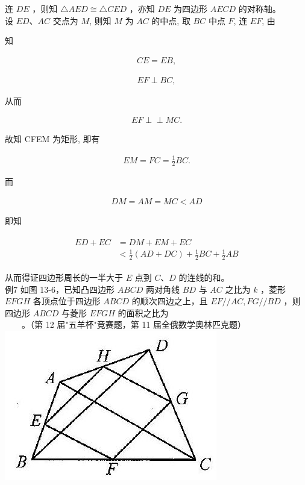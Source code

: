 \documentclass[10pt]{article}
\def\Perp{\perp\!\!\!\perp}
\begin{document}
连 $D E$ ，则知 $\triangle A E D \cong \triangle C E D$ ，亦知 $D E$ 为四边形 $A E C D$ 的对称轴。\\
设 $E D 、 A C$ 交点为 $M$, 则知 $M$ 为 $A C$ 的中点, 取 $B C$ 中点 $F$, 连 $E F$, 由

知

\begin{align*}
C E=E B,
\end{align*}

\begin{align*}
E F \perp B C,
\end{align*}

从而

\begin{align*}
E F \Perp M C .
\end{align*}

故知 CFEM 为矩形, 即有

\begin{align*}
E M=F C=\frac{1}{2} B C .
\end{align*}

而

\begin{align*}
D M=A M=M C<A D
\end{align*}

即知

\begin{align*}
\begin{aligned}
E D+E C & =D M+E M+E C \\
& <\frac{1}{2}(A D+D C)+\frac{1}{2} B C+\frac{1}{2} A B
\end{aligned}
\end{align*}

从而得证四边形周长的一半大于 $E$ 点到 $C 、 D$ 的连线的和。\\
例7 如图 13-6，已知凸四边形 $A B C D$ 两对角线 $B D$ 与 $A C$ 之比为 $k$ ，菱形 $E F G H$ 各顶点位于四边形 $A B C D$ 的顺次四边之上，且 $E F / / A C, F G / / B D$ ，则四边形 $A B C D$ 与菱形 $E F G H$ 的面积之比为\\
$\qquad$。（第 12 届"五羊杯"竞赛题，第 11 届全俄数学奥林匹克题）\\
\includegraphics[max width=\textwidth, center]{2024_10_30_2c8f45efd4a519b08e1ag-123}
\end{document}

